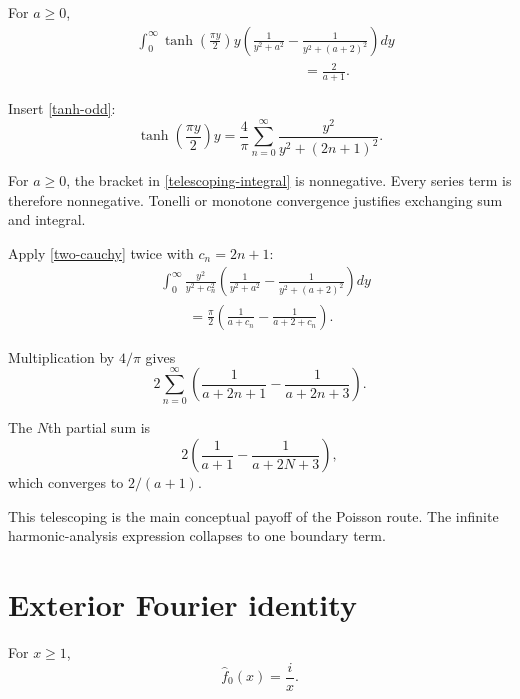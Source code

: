 \begin{theorem}
For $a\ge0$,
\begin{equation}
\begin{aligned}
&\int_0^\infty
  \tanh\!\left(\frac{\pi y}{2}\right)y
  \left(
    \frac1{y^2+a^2}
    -\frac1{y^2+(a+2)^2}
  \right)dy\\
&\hspace{5cm}=\frac2{a+1}.
\end{aligned}
\tag{telescoping-integral}\label{telescoping-integral}
\end{equation}
\end{theorem}

\begin{proofoutline}
\item Insert \eqref{tanh-odd}:
\[
  \tanh\!\left(\frac{\pi y}{2}\right)y
  =\frac4\pi\sum_{n=0}^\infty
     \frac{y^2}{y^2+(2n+1)^2}.
\]
\item For $a\ge0$, the bracket in \eqref{telescoping-integral} is nonnegative. Every series term is therefore nonnegative. Tonelli or monotone convergence justifies exchanging sum and integral.
\item Apply \eqref{two-cauchy} twice with $c_n=2n+1$:
\begin{align*}
&\int_0^\infty
\frac{y^2}{y^2+c_n^2}
\left(\frac1{y^2+a^2}-\frac1{y^2+(a+2)^2}\right)dy\\
&\qquad=\frac\pi2
\left(\frac1{a+c_n}-\frac1{a+2+c_n}\right).
\end{align*}
\item Multiplication by $4/\pi$ gives
\[
  2\sum_{n=0}^\infty
  \left(
    \frac1{a+2n+1}-\frac1{a+2n+3}
  \right).
\]
\item The $N$th partial sum is
\[
  2\left(\frac1{a+1}-\frac1{a+2N+3}\right),
\]
which converges to $2/(a+1)$.
\end{proofoutline}

This telescoping is the main conceptual payoff of the Poisson route. The infinite harmonic-analysis expression collapses to one boundary term.

\section{Exterior Fourier identity}

\begin{theorem}
For $x\ge1$,
\begin{equation}
  \widehat f_0(x)=\frac{i}{x}.
  \tag{positive-exterior}\label{positive-exterior}
\end{equation}
\end{theorem}

